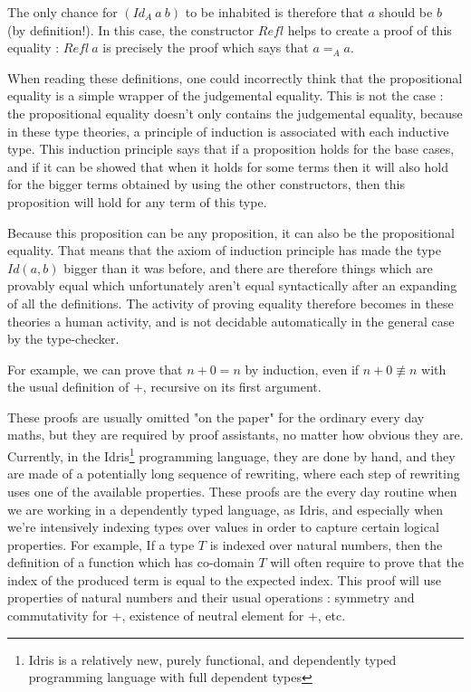 The only chance for $(Id_A\ a\ b)$ to be inhabited is therefore that $a$ should be $b$ (by definition!). In this case, the constructor $Refl$ helps to create a proof of this equality : $Refl\ a$ is precisely the proof which says that $a=_Aa$. 

When reading these definitions, one could incorrectly think that the propositional equality is a simple wrapper of the judgemental equality. This is not the case : the propositional equality doesn't only contains the judgemental equality, because in these type theories, a principle of induction is associated with each inductive type. This induction principle says that if a proposition holds for the base cases, and if it can be showed that when it holds for some terms then it will also hold for the bigger terms obtained by using the other constructors, then this proposition will hold for any term of this type.

Because this proposition can be any proposition, it can also be the propositional equality. That means that the axiom of induction principle has made the type $Id(a,b)$ bigger than it was before, and there are therefore things which are provably equal which unfortunately aren't equal syntactically after an expanding of all the definitions. The activity of proving equality therefore becomes in these theories a human activity, and is not decidable automatically in the general case by the type-checker.

For example, we can prove that $n+0 = n$ by induction, even if $n+0 \not\equiv n$ with the usual definition of $+$, recursive on its first argument. 

These proofs are usually omitted "on the paper" for the ordinary every day maths, but they are required by proof assistants, no matter how obvious they are. Currently, in the Idris\footnote{Idris is a relatively new, purely functional, and dependently typed programming language with full dependent types} programming language, they are done by hand, and they are made of a potentially long sequence of rewriting, where each step of rewriting uses one of the available properties. 
These proofs are the every day routine when we are working in a dependently typed language, as Idris, and especially when we're intensively indexing types over values in order to capture certain logical properties.
For example, If a type $T$ is indexed over natural numbers, then the definition of a function which has co-domain $T$ will often require to prove that the index of the produced term is equal to the expected index. This proof will use properties of natural numbers and their usual operations : symmetry and commutativity for +, existence of neutral element for +, etc.

